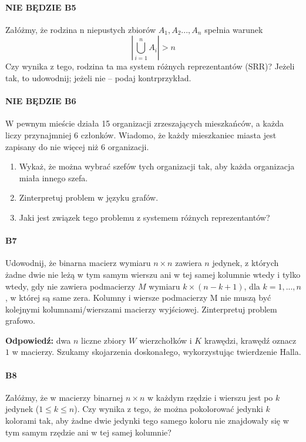 \paragraph{NIE BĘDZIE B5} Załóżmy, że rodzina n niepustych zbiorów $A_1, A_2 . . . , A_n$ spełnia warunek
$$|\bigcup _{i=1}^n A_i|>n$$
Czy wynika z tego, rodzina ta ma system różnych reprezentantów (SRR)? Jeżeli tak, to udowodnij; jeżeli nie – podaj kontrprzykład.

\paragraph{NIE BĘDZIE B6} W pewnym mieście działa 15 organizacji zrzeszających mieszkańców, a każda liczy przynajmniej 6 członków. Wiadomo, że każdy mieszkaniec miasta jest zapisany do nie więcej niż 6 organizacji.
\begin{enumerate}[label=\alph*)]
\item Wykaż, że można wybrać szefów tych organizacji tak, aby każda organizacja miała innego szefa.
\item Zinterpretuj problem w języku grafów.
\item Jaki jest związek tego problemu z systemem różnych reprezentantów?
\end{enumerate}

\paragraph{B7} Udowodnij, że binarna macierz wymiaru $n\times n$ zawiera $n$ jedynek, z których żadne dwie nie leżą w tym samym wierszu ani w tej samej kolumnie wtedy i tylko wtedy, gdy nie zawiera podmacierzy $M$ wymiaru $k \times (n - k + 1)$, dla $k = 1, . . . , n$, w której są same zera. Kolumny i wiersze podmacierzy M nie muszą być kolejnymi kolumnami/wierszami macierzy wyjściowej. Zinterpretuj problem grafowo.

\textbf{Odpowiedź: } dwa $n$ liczne zbiory $W$ wierzchołków i $K$ krawędzi, krawędź oznacz $1$ w macierzy. Szukamy skojarzenia doskonałego, wykorzystując twierdzenie Halla.
\paragraph{B8} Załóżmy, że w macierzy binarnej $n\times n$ w każdym rzędzie i wierszu jest po $k$ jedynek ($1 \leq k \leq n$). Czy wynika z tego, że można pokolorować jedynki $k$ kolorami tak, aby żadne dwie jedynki tego samego koloru nie znajdowały się w tym samym rzędzie ani w tej samej kolumnie?

